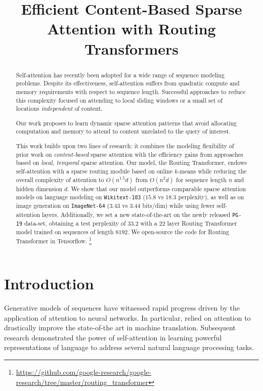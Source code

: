 \title{Efficient Content-Based Sparse Attention with Routing Transformers}

\begin{abstract}
Self-attention has recently been adopted for a wide range of sequence modeling problems. Despite its effectiveness, self-attention suffers from quadratic compute and memory requirements with respect to sequence length. Successful approaches to reduce this complexity focused on attending to local sliding windows or a small set of locations \emph{independent} of content. 

Our work proposes to learn dynamic sparse attention patterns that avoid allocating computation and memory to attend to content unrelated to the query of interest.

This work builds upon two lines of research: it combines the modeling flexibility of prior work on \emph{content-based} sparse attention with the efficiency gains from approaches based on \emph{local, temporal} sparse attention. Our model, the Routing Transformer, endows self-attention with a sparse routing module based on online \(k\)-means
while reducing the overall complexity of attention to \(O(n^{1.5}d)\) from \(O(n^2d)\)
for sequence length \(n\) and hidden dimension \(d\).
We show that our model outperforms comparable sparse attention models on language modeling on \texttt{Wikitext-103} ($15.8$ vs $18.3$ perplexity), as well as on image generation on \texttt{ImageNet-64} ($3.43$ vs $3.44$ bits/dim) while using fewer self-attention layers. Additionally, we set a new state-of-the-art on the newly released \texttt{PG-19} data-set, obtaining a test perplexity of 
\(33.2\) with a \(22\) layer Routing Transformer model trained on sequences of length \(8192\). We open-source the code for Routing Transformer in Tensorflow.
\footnote[1]{\url{https://github.com/google-research/google-research/tree/master/routing_transformer}}
\end{abstract}

\section{Introduction}

Generative models of sequences have witnessed rapid progress driven by the application of attention to neural networks. In particular, \citet{bahdanau2014neural,cho2014learning,vaswani2017attention}
relied on attention to drastically improve the state-of-the art in machine translation. Subsequent research
\citep{radford2018improving,devlin2018bert,liu2019multi, yang2019xlnet} demonstrated the power of self-attention in learning powerful representations of language to address several natural language processing tasks.

